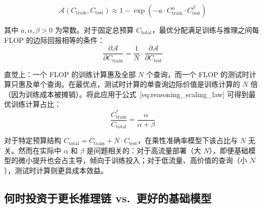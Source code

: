 \begin{equation}
    \mathcal{A}(C_{\text{train}}, C_{\text{test}}) \approx 1 - \exp\!\left(-a \cdot C_{\text{train}}^{\alpha} \cdot C_{\text{test}}^{\beta}\right)
\end{equation}

其中 $a, \alpha, \beta > 0$ 为常数。对于固定总预算 $C_{\text{total}}$，最优分配满足训练与推理之间每 FLOP 的边际回报相等的条件：
\begin{equation}
    \frac{\partial \mathcal{A}}{\partial C_{\text{train}}} = \frac{1}{N} \cdot \frac{\partial \mathcal{A}}{\partial C_{\text{test}}}
\end{equation}

直觉上：一个 FLOP 的训练计算惠及全部 $N$ 个查询，而一个 FLOP 的测试时计算只惠及单个查询。在最优点，测试时计算的单查询边际价值是训练计算的 $N$ 倍（因为训练成本被摊销）。将此应用于公式~[eq:reasoning\_scaling\_law] 可得到最优训练计算占比：
\begin{equation}
    \frac{C_{\text{train}}^*}{C_{\text{total}}} = \frac{\alpha}{\alpha + \beta}
\end{equation}

对于特定预算结构 $C_{\text{total}} = C_{\text{train}} + N \cdot C_{\text{test}}$，在乘性准确率模型下该占比与 $N$ 无关。然而在实际中 $\alpha$ 和 $\beta$ 是问题相关的：对于高流量部署（大 $N$），即便基础模型的微小提升也会占主导，倾向于训练投入；对于低流量、高价值的查询（小 $N$），测试时计算则更具成本效益。

\subsection{何时投资于更长推理链 vs.~更好的基础模型}
\label{when-to-invest-in-longer-chains-vs.-better-base-models}

